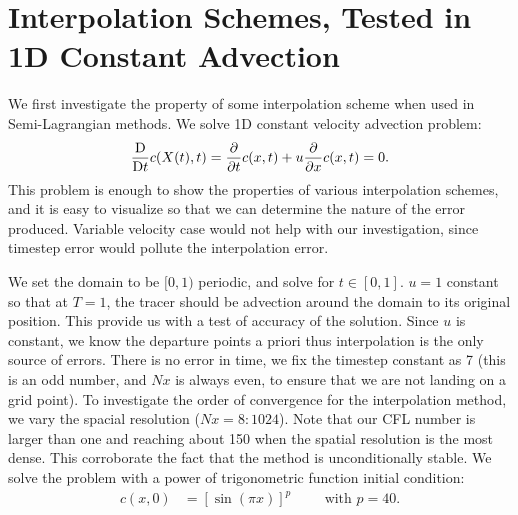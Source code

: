 \documentclass[11pt,letterpaper]{article}
\begin{document}
\section{Interpolation Schemes, Tested in 1D Constant Advection}\label{sec:interp1D}
We first investigate the property of some interpolation scheme when used in Semi-Lagrangian methods. We solve 1D constant velocity advection problem: 
\begin{align*}
        \frac{\mathrm{D}}{\mathrm{D} t}c(X(t),t) = \frac{\partial}{\partial t}c(x,t)+ u \frac{\partial}{\partial x}c(x,t) = 0.
\end{align*}
This problem is enough to show the properties of various interpolation schemes, and it is easy to visualize so that we can determine the nature of the error produced. Variable velocity case would not help with our investigation, since timestep error would pollute the interpolation error. %

We set the domain to be $[0,1)$ periodic, and solve for $t\in [0,1]$. $u = 1$ constant so that at $T = 1$, the tracer should be advection around the domain to its original position. This provide us with a test of accuracy of the solution. Since $u$ is constant, we know the departure points a priori thus interpolation is the only source of errors. There is no error in time, we fix the timestep constant as 7 (this is an odd number, and $Nx$ is always even, to ensure that we are not landing on a grid point). To investigate the order of convergence for the interpolation method, we vary the spacial resolution ($Nx = 8:1024$). Note that our CFL number is larger than one and reaching about 150 when the spatial resolution is the most dense. This corroborate the fact that the \sml\;method is unconditionally stable. We solve the problem with a power of trigonometric function initial condition:
\begin{align*}
    c(x,0) &= [\sin(\pi x)]^p \hspace{1cm}\text{with }p = 40.
\end{align*}
\end{document}
